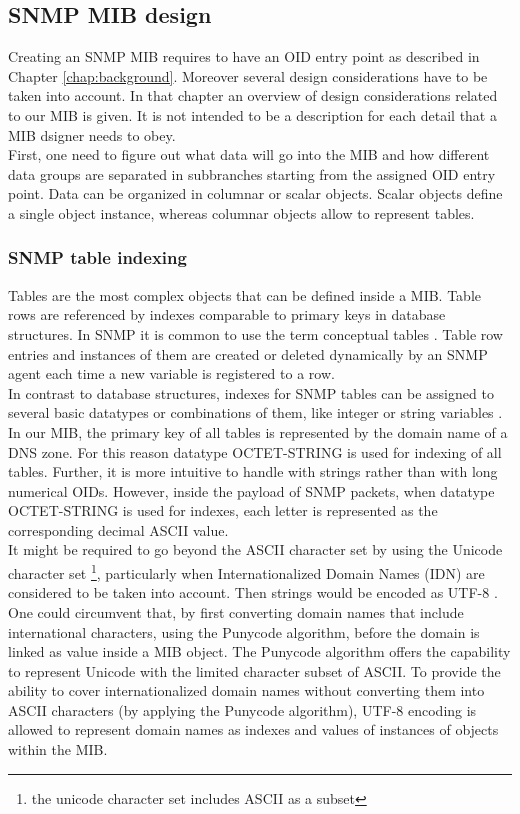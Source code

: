 \subsection{SNMP MIB design}
\label{section:mib-module}
Creating an SNMP MIB requires to have an OID entry point as described in Chapter \ref{chap:background}. Moreover several design considerations have to be taken into account. In that chapter an overview of design considerations related to our MIB is given. It is not intended to be a description for each detail that a MIB dsigner needs to obey.
\\
First, one need to  figure out what data will go into the MIB and how different data groups are separated in subbranches starting from the assigned OID entry point. Data can be organized in columnar or scalar objects. Scalar objects define a single object instance, whereas columnar objects allow to represent tables. 

\subsubsection{SNMP table indexing}

Tables are the most complex objects that can be defined inside a MIB. Table rows are referenced by indexes comparable to primary keys in database structures. In SNMP it is common to use the term conceptual tables \cite{perkins}. Table row entries and instances of them are created or deleted dynamically by an SNMP agent each time a new variable is registered to a row. 
\\
In contrast to database structures, indexes for SNMP tables can be assigned to several basic datatypes or combinations of them, like integer or string variables \cite{smiv2}.
\\
In our MIB, the primary key of all tables is represented by the domain name of a DNS zone. For this reason datatype OCTET-STRING is used for indexing of all tables. Further, it is more intuitive to handle with strings rather than with long numerical OIDs. However, inside the payload of SNMP packets, when datatype OCTET-STRING is used for indexes, each letter is represented as the corresponding decimal ASCII value. 
\\
It might be required to go beyond the ASCII character set by using the Unicode character set \footnote{the unicode character set includes ASCII as a subset}, particularly when Internationalized Domain Names (IDN) \cite{idn} are considered to be taken into account. Then strings would be encoded as UTF-8 \cite{utf-8}. One could circumvent that, by first converting domain names that include international characters, using the Punycode \cite{punycode} algorithm, before the domain is linked as value inside a MIB object. The Punycode algorithm offers the capability to represent Unicode with the limited character subset of ASCII. To provide the ability to cover internationalized domain names without converting them into ASCII characters (by applying the Punycode algorithm), UTF-8 encoding is allowed to represent domain names as indexes and values of instances of objects within the MIB.

